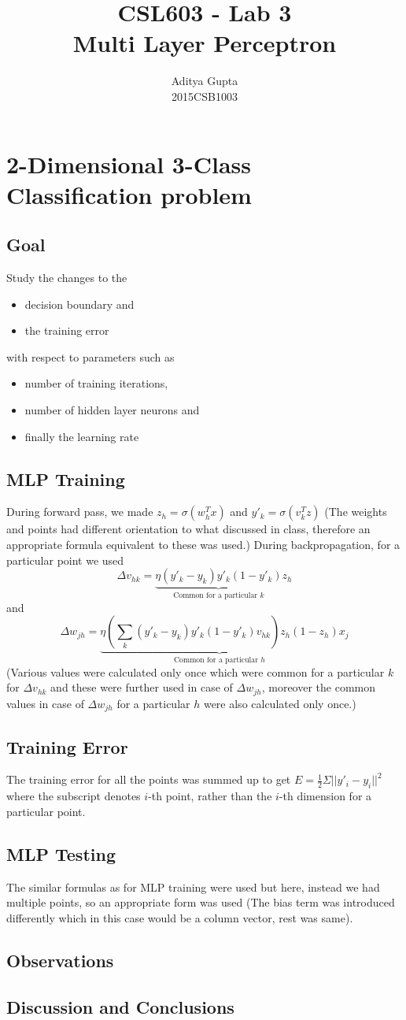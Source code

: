 \documentclass{article}
\title{CSL603 - Lab 3\\Multi Layer Perceptron}
\author{Aditya Gupta\\2015CSB1003}
\begin{document}
\maketitle
\section{2-Dimensional 3-Class Classification problem}
\subsection{Goal} Study the changes to the 
\begin{itemize}
\item decision boundary and 
\item the training error
\end{itemize} with respect to parameters such as 
\begin{itemize}
\item number of training iterations,
\item number of hidden layer neurons and
\item finally the learning rate
\end{itemize}
\subsection{MLP Training}
During forward pass, we made $z_h=\sigma(w_h^Tx)$ and $y'_k=\sigma(v_k^Tz)$ (The weights and points had different orientation to what discussed in class, therefore an appropriate formula equivalent to these was used.)
During backpropagation, for a particular point we used $$\Delta v_{hk}=\underbrace{\eta(y'_k-y_k)y'_k(1-y'_k)}_{\text{Common for a particular } k}z_h$$ and $$\Delta w_{jh}=\underbrace{\eta\left(\sum_k(y'_k-y_k)y'_k(1-y'_k)v_{hk}\right)z_h(1-z_h)}_{\text{Common for a particular }h}x_j$$ (Various values were calculated only once which were common for a particular $k$ for $\Delta v_{hk}$ and these were further used in case of $\Delta w_{jh}$, moreover the common values in case of $\Delta w_{jh}$ for a particular $h$ were also calculated only once.)
\subsection{Training Error}
The training error for all the points was summed up to get $E=\frac 12\Sigma||y'_i-y_i||^2$ where the subscript denotes $i$-th point, rather than the $i$-th dimension for a particular point.
\subsection{MLP Testing}
The similar formulas as for MLP training were used but here, instead we had multiple points, so an appropriate form was used (The bias term was introduced differently which in this case would be a column vector, rest was same).
\subsection{Observations}

\subsection{Discussion and Conclusions}
\end{document}
